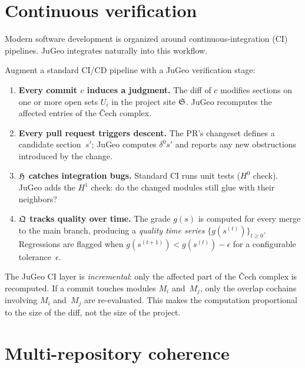 \section{Continuous verification}
\label{sec:continuous-verif}

Modern software development is organized around
continuous-integration (CI) pipelines.  JuGeo integrates naturally
into this workflow.

\begin{construction}
\label{con:ci-layer}
Augment a standard CI/CD pipeline with a JuGeo verification stage:
\begin{enumerate}
  \item \textbf{Every commit $c$ induces a judgment.}\;
        The diff of $c$ modifies sections on one or more open sets
        $U_i$ in the project site $\mathfrak{S}$.  JuGeo recomputes the
        affected entries of the \v{C}ech complex.
  \item \textbf{Every pull request triggers descent.}\;
        The PR's changeset defines a candidate section~$s'$;
        JuGeo computes $\delta^0 s'$ and reports any new
        obstructions introduced by the change.
  \item \textbf{$\mathfrak{H}$ catches integration bugs.}\;
        Standard CI runs unit tests ($H^0$ check).  JuGeo adds the
        $H^1$ check: do the changed modules still glue with their
        neighbors?
  \item \textbf{$\mathfrak{Q}$ tracks quality over time.}\;
        The grade $g(s)$ is computed for every merge to the main
        branch, producing a \emph{quality time series}
        $\{g(s^{(t)})\}_{t \geq 0}$.  Regressions are flagged when
        $g(s^{(t+1)}) < g(s^{(t)}) - \epsilon$ for a configurable
        tolerance~$\epsilon$.
\end{enumerate}
\end{construction}

\begin{remark}
The JuGeo CI layer is \emph{incremental}: only the affected
part of the \v{C}ech complex is recomputed.  If a commit touches
modules $M_i$ and~$M_j$, only the overlap cochains involving $M_i$
and~$M_j$ are re-evaluated.  This makes the computation
proportional to the size of the diff, not the size of the project.
\end{remark}

\section{Multi-repository coherence}
\label{sec:multi-repo}

